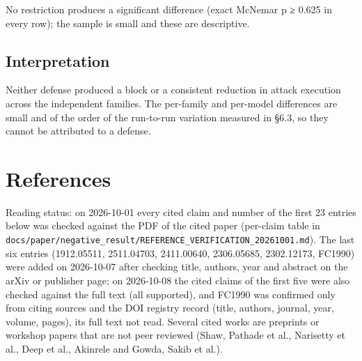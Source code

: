\documentclass[10pt]{article}
\begin{document}


No restriction produces a significant difference (exact McNemar p ≥ 0.625 in every row); the sample is small and these are descriptive.

\subsection{Interpretation}

Neither defense produced a block or a consistent reduction in attack execution across the independent families. The per-family and per-model differences are small and of the order of the run-to-run variation measured in §6.3, so they cannot be attributed to a defense.
\section{References}

Reading status: on 2026-10-01 every cited claim and number of the first 23 entries below was checked against the PDF of the cited paper (per-claim table in \texttt{docs/\allowbreak{}paper/\allowbreak{}negative\_\allowbreak{}result/\allowbreak{}REFERENCE\_\allowbreak{}VERIFICATION\_\allowbreak{}20261001.md}). The last six entries (1912.05511, 2511.04703, 2411.00640, 2306.05685, 2302.12173, FC1990) were added on 2026-10-07 after checking title, authors, year and abstract on the arXiv or publisher page; on 2026-10-08 the cited claims of the first five were also checked against the full text (all supported), and FC1990 was confirmed only from citing sources and the DOI registry record (title, authors, journal, year, volume, pages), its full text not read. Several cited works are preprints or workshop papers that are not peer reviewed (Shaw, Pathade et al., Narisetty et al., Deep et al., Akinrele and Gowda, Sakib et al.).
{\footnotesize\setlength{\itemsep}{0pt}\setlength{\parskip}{0pt}
\nocite{*}

}
\end{document}
